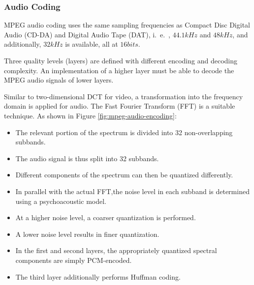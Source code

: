 
\subsubsection{Audio Coding}
MPEG audio coding uses the same sampling frequencies as Compact Disc Digital Audio (CD-DA) and Digital Audio Tape (DAT), i.\ e.\ , $ 44.1 kHz $ and $ 48 kHz $, and additionally, $ 32kHz $ is available, all at $ 16 bits $.

Three quality levels (layers) are defined with different encoding and decoding complexity. An implementation of a higher layer must be able to decode the MPEG audio signals of lower layers.


Similar to two-dimensional DCT for video, a transformation into the frequency domain is applied for audio. The Fast Fourier Transform (FFT) is a suitable technique.
As shown in Figure \ref{fig:mpeg-audio-encoding}:
\begin{itemize}
	\item The relevant portion of the spectrum is divided into 32 non-overlapping subbands. 
	\item The audio signal is thus split into 32 subbands. 
	\item Different components of the spectrum can then be quantized differently. 
	\item In parallel with the actual FFT,the noise level in each subband is determined using a psychoacoustic model. 
	\item At a higher noise level, a coarser quantization is performed. 
	\item A lower noise level results in finer quantization.
	\item In the first and second layers, the appropriately quantized spectral components are simply PCM-encoded. 
	\item The third layer additionally performs Huffman	coding.
\end{itemize}

